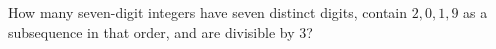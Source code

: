 How many seven-digit integers have seven distinct digits, contain $2,0,1,9$ as a subsequence in that order, and are divisible by $3$?
